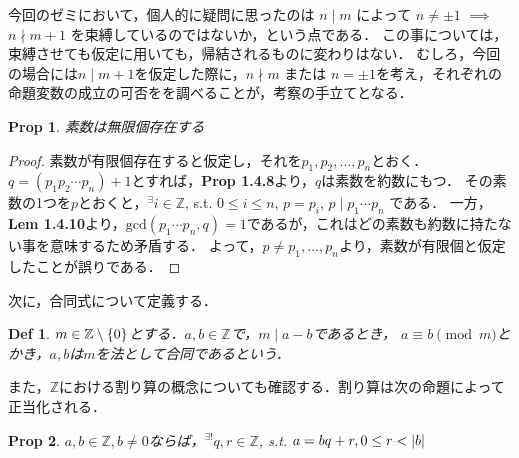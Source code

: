 \documentclass{jsarticle}
\DeclarePairedDelimiter{\abs}{\lvert}{\rvert} %
\DeclarePairedDelimiter{\cbra}{\lbrace}{\rbrace} %
\newtheorem{dfn}{Def}
\newtheorem{prop}{Prop}
\newcommand{\integer}{\mathbb{Z}}
\begin{document}
    今回のゼミにおいて，個人的に疑問に思ったのは $n \mid m$ によって $n \neq \pm 1$ $\implies$ $n \nmid m + 1$ を束縛しているのではないか，という点である．
    この事については，束縛させても仮定に用いても，帰結されるものに変わりはない．
    むしろ，今回の場合には$n \mid m+1$を仮定した際に，$n \nmid m$ または $n = \pm 1$を考え，それぞれの命題変数の成立の可否をを調べることが，考察の手立てとなる．

    \begin{prop}
      素数は無限個存在する
    \end{prop}

    \begin{proof}
      素数が有限個存在すると仮定し，それを$p_1, p_2, ... , p_n $とおく．
      $q=(p_1 p_2 \cdots p_n) + 1$とすれば，\textbf{Prop 1.4.8}より，$q$は素数を約数にもつ．
      その素数の1つを$p$とおくと，$^{\exists}i \in \integer$, s.t. $0 \leq i \leq n$, $p = p_i$, $p \mid p_1 \cdots p_n$ である．
      一方，\textbf{Lem 1.4.10}より，$\mathrm{gcd} (p_1 \cdots p_n, q)=1$であるが，これはどの素数も約数に持たない事を意味するため矛盾する．
      よって，$p \neq p_1, ... , p_n$より，素数が有限個と仮定したことが誤りである．
    \end{proof}

    次に，合同式について定義する．

    \begin{dfn}
      $m \in \integer \setminus \cbra{0}$とする．$a, b \in \integer$で，$m \mid a-b$であるとき，
      $a \equiv b \pmod m$とかき，$a,b$は$m$を法として合同であるという．
    \end{dfn}

    また，$\integer$における割り算の概念についても確認する．割り算は次の命題によって正当化される．

    \begin{prop}
      $a, b \in \integer, b \neq 0$ならば，$^{\exists !}q,r \in \integer$, s.t. $a=bq+r, 0 \leq r < \abs{b}$
    \end{prop}
\end{document}
